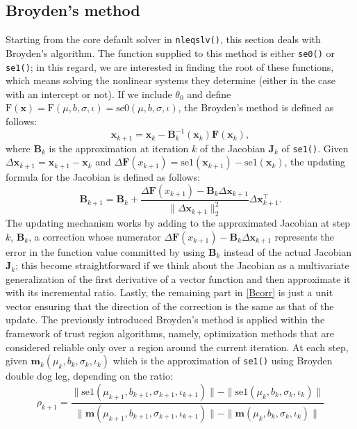 \documentclass{article}
\begin{document}
\subsection{Broyden's method}
Starting from the core default solver in \texttt{nleqslv()}, this section deals with Broyden's algorithm. The function supplied to this method is either \texttt{se0()} or \texttt{se1()}; in this regard, we are interested in finding the root of these functions, which means solving the nonlinear systems they determine (either in the case with an intercept or not). If we include $\theta_0$ and define $\text{F}(\mathbf{x})=\text{F}(\mu,b,\sigma,\iota)=\text{se0}(\mu,b,\sigma,\iota)$, the Broyden's method is defined as follows:
\begin{equation*}
\mathbf{x}_{k+1}=\mathbf{x}_k-\mathbf{B}^{-1}_k(\mathbf{x}_k)\mathbf{F}(\mathbf{x}_k),
\end{equation*}
where $\mathbf{B}_k$ is the approximation at iteration $k$ of the Jacobian $\mathbf{J}_k$ of \texttt{se1()}. Given $\Delta\mathbf{x}_{k+1}=\mathbf{x}_{k+1}-\mathbf{x}_{k}$ and $\Delta\mathbf{F}({x}_{k+1})= \text{se1}(\mathbf{x}_{k+1})-\text{se1}(\mathbf{x}_{k})$, the updating formula for the Jacobian is defined as follows:
\begin{equation}
\mathbf{B}_{k+1}=\mathbf{B}_k+\frac{\Delta\mathbf{F}({x}_{k+1})-\mathbf{B}_k\Delta\mathbf{x}_{k+1}}{\|\Delta\mathbf{x}_{k+1}\|_2^2}\Delta\mathbf{x}_{k+1}^\top.
\label{Bcorr}
\end{equation}
The updating mechanism works by adding to the approximated Jacobian at step $k$, $\mathbf{B}_k$, a correction whose numerator $\Delta\mathbf{F}({x}_{k+1})-\mathbf{B}_k\Delta\mathbf{x}_{k+1}$ represents the error in the function value committed by using $\mathbf{B}_k$ instead of the actual Jacobian $\mathbf{J}_k$; this become straightforward if we think about the Jacobian as a multivariate generalization of the first derivative of a vector function and then approximate it with its incremental ratio. Lastly, the remaining part in \eqref{Bcorr} is just a unit vector ensuring that the direction of the correction is the same as that of the update. 
The previously introduced Broyden's method is applied within the framework of trust region algorithms, namely, optimization methods that are considered reliable only over a region around the current iteration. At each step, given $\textbf{m}_k(\mu_k,b_k,\sigma_k,\iota_k)$ which is the approximation of \texttt{se1()} using Broyden double dog leg, depending on the ratio:  
\begin{equation}
\rho_{k+1}=\frac{\|\text{se1}(\mu_{k+1},b_{k+1},\sigma_{k+1},\iota_{k+1})\|-\|\text{se1}(\mu_{k},b_{k},\sigma_{k},\iota_{k})\|}{\|\textbf{m}(\mu_{k+1},b_{k+1},\sigma_{k+1},\iota_{k+1})\|-\|\textbf{m}(\mu_{k},b_{k},\sigma_{k},\iota_{k})\|}
\end{equation}
\end{document}
